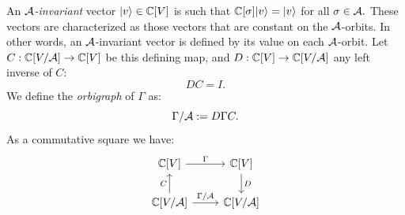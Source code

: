 An \emph{$\mathcal{A}$-invariant} vector $|{v}\rangle\in\mathbb{C}[V]$
is such that $\mathbb{C}[\sigma]|{v}\rangle=|{v}\rangle$ for all $\sigma\in\mathcal{A}.$
These vectors are characterized as those vectors that are constant
on the $\mathcal{A}$-orbits.
In other words, an $\mathcal{A}$-invariant vector is
defined by its value on each $\mathcal{A}$-orbit.
Let $C:\mathbb{C}[V/\mathcal{A}]\to\mathbb{C}[V]$ be
this defining map, and 
$D:\mathbb{C}[V]\to\mathbb{C}[V/\mathcal{A}]$ any left inverse of $C$:
$$
    DC = I.
$$
We define the \emph{orbigraph} of $\Gamma$ as:
$$
    \Gamma/\mathcal{A} := D\Gamma C.
$$
As a commutative square we have:
\[
\begin{tikzcd}
\Complex[V] \arrow{r}{\Gamma} & \Complex[V] \arrow{d}{D} \\
\Complex[V/\auto] \arrow{u}{C} \arrow{r}{\Gamma/\auto} & \Complex[V/\auto] 
\end{tikzcd}
\]




